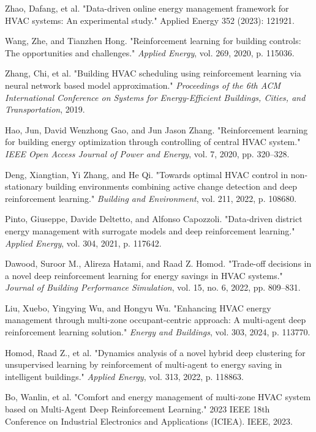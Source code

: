 \documentclass[preprint,12pt]{elsarticle}
\begin{document}
\begin{thebibliography}{16}
Zhao, Dafang, et al. "Data-driven online energy management framework for HVAC systems: An experimental study." Applied Energy 352 (2023): 121921.

Wang, Zhe, and Tianzhen Hong. "Reinforcement learning for building controls: The opportunities and challenges." \textit{Applied Energy}, vol. 269, 2020, p. 115036.
    
Zhang, Chi, et al. "Building HVAC scheduling using reinforcement learning via neural network based model approximation." \textit{Proceedings of the 6th ACM International Conference on Systems for Energy-Efficient Buildings, Cities, and Transportation}, 2019.
    
Hao, Jun, David Wenzhong Gao, and Jun Jason Zhang. "Reinforcement learning for building energy optimization through controlling of central HVAC system." \textit{IEEE Open Access Journal of Power and Energy}, vol. 7, 2020, pp. 320–328.
    
Deng, Xiangtian, Yi Zhang, and He Qi. "Towards optimal HVAC control in non-stationary building environments combining active change detection and deep reinforcement learning." \textit{Building and Environment}, vol. 211, 2022, p. 108680.
    
Pinto, Giuseppe, Davide Deltetto, and Alfonso Capozzoli. "Data-driven district energy management with surrogate models and deep reinforcement learning." \textit{Applied Energy}, vol. 304, 2021, p. 117642.
    
Dawood, Suroor M., Alireza Hatami, and Raad Z. Homod. "Trade-off decisions in a novel deep reinforcement learning for energy savings in HVAC systems." \textit{Journal of Building Performance Simulation}, vol. 15, no. 6, 2022, pp. 809–831.
    
Liu, Xuebo, Yingying Wu, and Hongyu Wu. "Enhancing HVAC energy management through multi-zone occupant-centric approach: A multi-agent deep reinforcement learning solution." \textit{Energy and Buildings}, vol. 303, 2024, p. 113770.
    
Homod, Raad Z., et al. "Dynamics analysis of a novel hybrid deep clustering for unsupervised learning by reinforcement of multi-agent to energy saving in intelligent buildings." \textit{Applied Energy}, vol. 313, 2022, p. 118863.

Bo, Wanlin, et al. "Comfort and energy management of multi-zone HVAC system based on Multi-Agent Deep Reinforcement Learning." 2023 IEEE 18th Conference on Industrial Electronics and Applications (ICIEA). IEEE, 2023.


\end{thebibliography}
\end{document}
